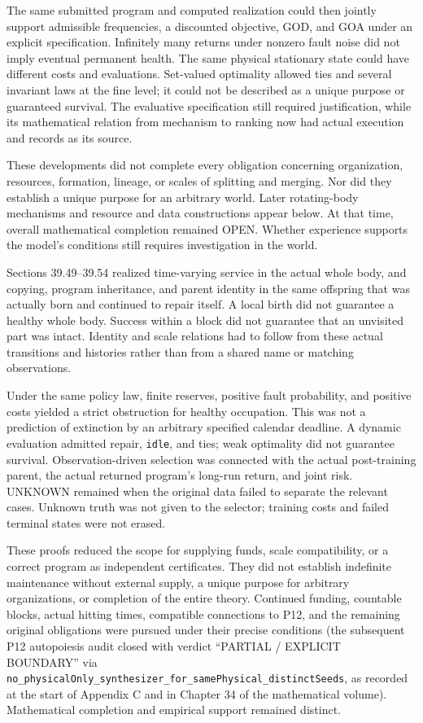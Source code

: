 \documentclass[
  english,
  11pt,
  oneside]{book}
\begin{document}
The same submitted program and computed realization could then jointly support admissible frequencies, a discounted objective, GOD, and GOA under an explicit specification. Infinitely many returns under nonzero fault noise did not imply eventual permanent health. The same physical stationary state could have different costs and evaluations. Set-valued optimality allowed ties and several invariant laws at the fine level; it could not be described as a unique purpose or guaranteed survival. The evaluative specification still required justification, while its mathematical relation from mechanism to ranking now had actual execution and records as its source.

These developments did not complete every obligation concerning organization, resources, formation, lineage, or scales of splitting and merging. Nor did they establish a unique purpose for an arbitrary world. Later rotating-body mechanisms and resource and data constructions appear below. At that time, overall mathematical completion remained OPEN. Whether experience supports the model's conditions still requires investigation in the world.

Sections 39.49--39.54 realized time-varying service in the actual whole body, and copying, program inheritance, and parent identity in the same offspring that was actually born and continued to repair itself. A local birth did not guarantee a healthy whole body. Success within a block did not guarantee that an unvisited part was intact. Identity and scale relations had to follow from these actual transitions and histories rather than from a shared name or matching observations.

Under the same policy law, finite reserves, positive fault probability, and positive costs yielded a strict obstruction for healthy occupation. This was not a prediction of extinction by an arbitrary specified calendar deadline. A dynamic evaluation admitted repair, \texttt{idle}, and ties; weak optimality did not guarantee survival. Observation-driven selection was connected with the actual post-training parent, the actual returned program's long-run return, and joint risk. UNKNOWN remained when the original data failed to separate the relevant cases. Unknown truth was not given to the selector; training costs and failed terminal states were not erased.

These proofs reduced the scope for supplying funds, scale compatibility, or a correct program as independent certificates. They did not establish indefinite maintenance without external supply, a unique purpose for arbitrary organizations, or completion of the entire theory. Continued funding, countable blocks, actual hitting times, compatible connections to P12, and the remaining original obligations were pursued under their precise conditions (the subsequent P12 autopoiesis audit closed with verdict ``PARTIAL / EXPLICIT BOUNDARY'' via \nolinkurl{no_physicalOnly_synthesizer_for_samePhysical_distinctSeeds}, as recorded at the start of Appendix C and in Chapter 34 of the mathematical volume). Mathematical completion and empirical support remained distinct.
\end{document}
